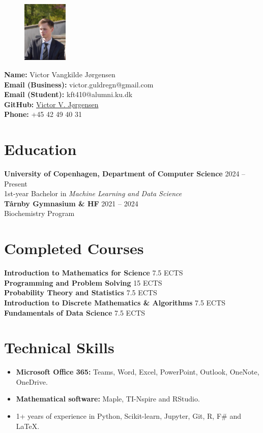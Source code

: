 \documentclass[a4paper,10pt]{article}
\makeatletter
\newcommand{\name}{Victor Vangkilde Jørgensen}
\newcommand{\phone}{+45 42 49 40 31}
\newcommand{\emailBusiness}{victor.guldregn@gmail.com}
\newcommand{\emailStudent}{kft410@alumni.ku.dk}
\makeatother
\begin{document}
\begin{figure}[h!]
    \centering
    \includegraphics[width=0.19\textwidth, trim={3cm 2cm 1.5cm 4cm}, clip, cfbox=gr 1.25pt 0pt]{profilbillede.jpg}
\end{figure}

\noindent
\textbf{Name:} \name\\
\textbf{Email (Business):} \emailBusiness\\
\textbf{Email (Student):} \emailStudent\\
\textbf{GitHub:} \href{https://github.com/P1N60}{Victor V. Jørgensen}\\
\textbf{Phone:} \phone
\n
\section*{Education}
\textbf{University of Copenhagen, Department of Computer Science} \hfill 2024 -- Present \\
1st-year Bachelor in \textit{Machine Learning and Data Science}\\
\textbf{T\aa rnby Gymnasium \& HF} \hfill 2021 -- 2024\\ 
Biochemistry Program
\n
\section*{Completed Courses}
\textbf{Introduction to Mathematics for Science} \hfill 7.5 ECTS\\
\textbf{Programming and Problem Solving} \hfill 15 ECTS\\
\textbf{Probability Theory and Statistics} \hfill 7.5 ECTS\\
\textbf{Introduction to Discrete Mathematics \& Algorithms} \hfill 7.5 ECTS\\ 
\textbf{Fundamentals of Data Science} \hfill 7.5 ECTS
\n
\section*{Technical Skills}
\begin{itemize}[noitemsep, topsep=0pt]
    \item \textbf{Microsoft Office 365:} Teams, Word, Excel, PowerPoint, Outlook, OneNote, OneDrive. 
    \item \textbf{Mathematical software:} Maple, TI-Nspire and RStudio.
    \item 1+ years of experience in Python, Scikit-learn, Jupyter, Git, R, F\# and \LaTeX.
\end{itemize}
\n
\end{document}
